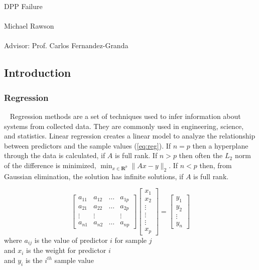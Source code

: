 \documentclass{article}
\begin{document}
\begin{center}
\large
DPP Failure\\
\normalsize
~\\
Michael Rawson\\
~\\
Advisor: Prof. Carlos Fernandez-Granda
\end{center}

\subsection*{Introduction}
\subsubsection*{Regression}
\qquad ~ Regression methods are a set of techniques used to infer information about systems from collected data. They are commonly used in engineering, science, and statistics. Linear regression creates a linear model to analyze the relationship between predictors and the sample values (\ref{eq:reg}). If $n=p$ then a hyperplane through the data is calculated, if $A$ is full rank. If $n>p$ then often the $L_2$ norm of the difference is minimized, $\min_{x\in \mathbf R^p} \|Ax-y\|_2$. If $n<p$ then, from Gaussian elimination, the solution has infinite solutions, if $A$ is full rank. 

\begin{equation} \label{eq:reg}
\begin{bmatrix}
    a_{11}       & a_{12} & \dots & a_{1p} \\
    a_{21}       & a_{22} & \dots & a_{2p} \\
    \vdots	    & \vdots  &          & \vdots  \\
    a_{n1}       & a_{n2} & \dots & a_{np}
\end{bmatrix} \begin{bmatrix}
    x_{1} \\
    x_{2} \\
    \vdots \\
    \vdots \\
    \vdots \\
    x_{p}
\end{bmatrix}=\begin{bmatrix}
    y_{1} \\
    y_{2} \\
    \vdots \\
    y_{n}
\end{bmatrix}
\end{equation}
where $a_{ij}$ is the value of predictor $i$ for sample $j$\\
and $x_i$ is the weight for predictor $i$\\
and $y_i$ is the $i^{th}$ sample value\\
\end{document}
